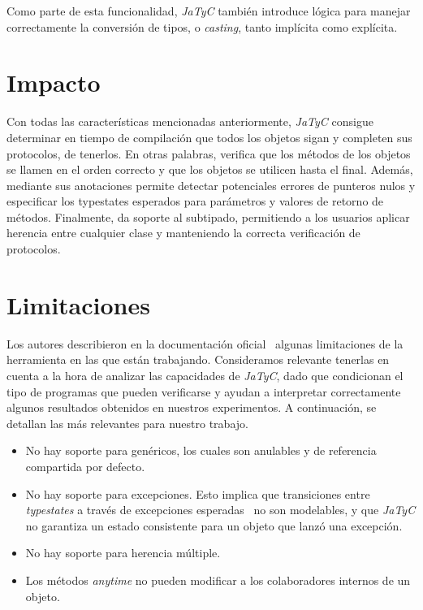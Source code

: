 Como parte de esta funcionalidad, \textit{JaTyC} también introduce lógica para manejar correctamente la conversión de tipos, o \textit{casting}, tanto implícita como explícita.

\section{Impacto}

Con todas las características mencionadas anteriormente, \textit{JaTyC} consigue determinar en tiempo de compilación que todos los objetos sigan y completen sus protocolos, de tenerlos. En otras palabras, verifica que los métodos de los objetos se llamen en el orden correcto y que los objetos se utilicen hasta el final. Además, mediante sus anotaciones permite detectar potenciales errores de punteros nulos y especificar los typestates esperados para parámetros y valores de retorno de métodos. Finalmente, da soporte al subtipado, permitiendo a los usuarios aplicar herencia entre cualquier clase y manteniendo la correcta verificación de protocolos.

\section{Limitaciones}
\label{limitaciones}

Los autores describieron en la documentación oficial~\cite{jatyc:documentation} algunas limitaciones de la herramienta en las que están trabajando. Consideramos relevante tenerlas en cuenta a la hora de analizar las capacidades de \textit{JaTyC}, dado que condicionan el tipo de programas que pueden verificarse y ayudan a interpretar correctamente algunos resultados obtenidos en nuestros experimentos. A continuación, se detallan las más relevantes para nuestro trabajo.

\begin{itemize}
    \item No hay soporte para genéricos, los cuales son anulables y de referencia compartida por defecto.
    \item No hay soporte para excepciones. Esto implica que transiciones entre \textit{typestates} a través de excepciones esperadas~\cite{xepa} no son modelables, y que \textit{JaTyC} no garantiza un estado consistente para un objeto que lanzó una excepción.
    \item No hay soporte para herencia múltiple.
    \item Los métodos \textit{anytime} no pueden modificar a los colaboradores internos de un objeto.
\end{itemize}

